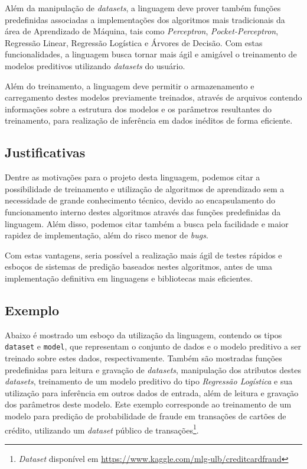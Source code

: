 \documentclass[12pt]{article}
\begin{document}
Além da manipulação de {\it datasets}, a linguagem deve prover também funções predefinidas associadas a implementações dos algoritmos mais tradicionais da área de Aprendizado de Máquina, tais como {\it Perceptron}, {\it Pocket-Perceptron}, Regressão Linear, Regressão Logística e Árvores de Decisão. Com estas funcionalidades, a linguagem busca tornar mais ágil e amigável o treinamento de modelos preditivos utilizando {\it datasets} do usuário.

Além do treinamento, a linguagem deve permitir o armazenamento e carregamento destes modelos previamente treinados, através de arquivos contendo informações sobre a estrutura dos modelos e os parâmetros resultantes do treinamento, para realização de inferência em dados inéditos de forma eficiente.

\subsection{Justificativas}

Dentre as motivações para o projeto desta linguagem, podemos citar a possibilidade de treinamento e utilização de algoritmos de aprendizado sem a necessidade de grande conhecimento técnico, devido ao encapsulamento do funcionamento interno destes algoritmos através das funções predefinidas da linguagem. Além disso, podemos citar também a busca pela facilidade e maior rapidez de implementação, além do risco menor de {\it bugs}. 

Com estas vantagens, seria possível a realização mais ágil de testes rápidos e esboços de sistemas de predição baseados nestes algoritmos, antes de uma implementação definitiva em linguagens e bibliotecas mais eficientes.

\subsection{Exemplo}

Abaixo é mostrado um esboço da utilização da linguagem, contendo os tipos {\tt dataset} e {\tt model}, que representam o conjunto de dados e o modelo preditivo a ser treinado sobre estes dados, respectivamente. Também são mostradas funções predefinidas para leitura e gravação de {\it datasets}, manipulação dos atributos destes {\it datasets}, treinamento de um modelo preditivo do tipo {\it Regressão Logística} e sua utilização para inferência em outros dados de entrada, além de leitura e gravação dos parâmetros deste modelo. Este exemplo corresponde ao treinamento de um modelo para predição de probabilidade de fraude em transações de cartões de crédito, utilizando um {\it dataset} público de transações\footnote{{\it Dataset} disponível em \url{https://www.kaggle.com/mlg-ulb/creditcardfraud}}.
\end{document}
